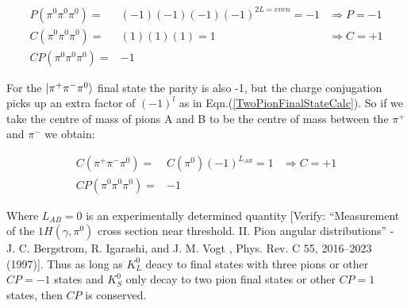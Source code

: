 \begin{align*}
P(\pi^0 \pi^0 \pi^0)  = & (-1)(-1)(-1)(-1)^{2L = even} = -1 & \Rightarrow P = -1 \\
C(\pi^0 \pi^0 \pi^0)  = & (1)(1)(1) = 1                     & \Rightarrow C = +1 \\
CP(\pi^0 \pi^0 \pi^0) = & -1                                &
\end{align*}

\noindent For the $\ket{\pi^+ \pi^- \pi^0}$ final state the parity is also -1, but the charge conjugation picks up an extra factor of $(-1)^{l}$ as in Eqn.(\ref{TwoPionFinalStateCalc}). So if we take the centre of mass of pions A and B to be the centre of mass between the $\pi^{+}$ and $\pi^{-}$ we obtain:

\begin{align*}
C(\pi^+ \pi^- \pi^0)  = & C(\pi^{0})(-1)^{{L}_{AB}} = 1     & \Rightarrow C = +1 \\
CP(\pi^0 \pi^0 \pi^0) = & -1                                &
\end{align*}
 
\noindent Where ${L}_{AB} = 0$ is an experimentally determined quantity [Verify: ``Measurement of the $1H(\gamma,\pi^{0})$ cross section near threshold. II. Pion angular distributions'' - J. C. Bergstrom, R. Igarashi, and J. M. Vogt , Phys. Rev. C 55, 2016–2023 (1997)]. Thus as long as $K^{0}_{L}$ deacy to final states with three pions or other $CP = -1$ states and $K^{0}_{S}$ only decay to two pion final states or other $CP = 1$ states, then $CP$ is conserved.

